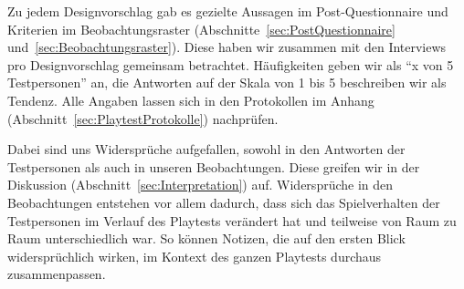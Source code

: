 \documentclass[../Main.tex]{subfiles}
\begin{document}
Zu jedem Designvorschlag gab es gezielte Aussagen im Post-Questionnaire und Kriterien im Beobachtungsraster (Abschnitte~\ref{sec:PostQuestionnaire} und~\ref{sec:Beobachtungsraster}). Diese haben wir zusammen mit den Interviews pro Designvorschlag gemeinsam betrachtet. Häufigkeiten geben wir als \enquote{x von 5 Testpersonen} an, die Antworten auf der Skala von 1 bis 5 beschreiben wir als Tendenz. Alle Angaben lassen sich in den Protokollen im Anhang (Abschnitt~\ref{sec:PlaytestProtokolle}) nachprüfen.

Dabei sind uns Widersprüche aufgefallen, sowohl in den Antworten der Testpersonen als auch in unseren Beobachtungen. Diese greifen wir in der Diskussion (Abschnitt~\ref{sec:Interpretation}) auf. Widersprüche in den Beobachtungen entstehen vor allem dadurch, dass sich das Spielverhalten der Testpersonen im Verlauf des Playtests verändert hat und teilweise von Raum zu Raum unterschiedlich war. So können Notizen, die auf den ersten Blick widersprüchlich wirken, im Kontext des ganzen Playtests durchaus zusammenpassen.
\end{document}
